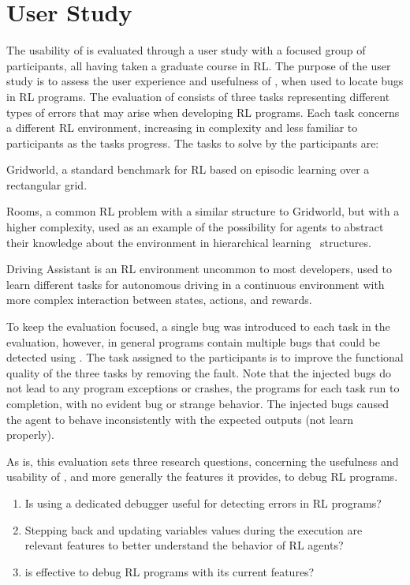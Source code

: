 
\section{User Study}
\label{sec:evaluation}

The usability of \flik is evaluated through a user study with a focused group of participants, all having 
taken a graduate course in \ac{RL}. The purpose of the user study is to assess the user experience 
and usefulness of \flik, when used to locate bugs in \ac{RL} programs. 
The evaluation of \flik consists of three tasks representing different types of errors that may arise 
when developing \ac{RL} programs. Each task concerns a different \ac{RL} environment, increasing 
in complexity and less familiar to participants as the tasks progress. The tasks to solve by the 
participants are:
\begin{enumerate*}[label=(\arabic*)]
\item Gridworld, a standard benchmark for \ac{RL} based on episodic learning over a rectangular grid.
\item Rooms, a common \ac{RL} problem with a similar structure to Gridworld, but with a higher 
complexity, used as an example of the possibility for agents to abstract their knowledge about the 
environment in hierarchical learning~\cite{pateria21} structures. 
\item Driving Assistant is an \ac{RL} environment
uncommon to most developers, used to learn different tasks for autonomous driving in a continuous 
environment with more complex interaction between states, actions, and rewards. 
\end{enumerate*}

To keep the evaluation focused, a single bug was introduced to each task in the evaluation, however, 
in general programs contain multiple bugs that could be detected using \flik. The task assigned to the 
participants is to improve the functional quality of the three tasks by removing the fault. Note that 
the injected bugs do not lead to any program exceptions or crashes, \ie the programs for each task 
run to completion, with no evident bug or strange behavior. The injected bugs caused the agent to 
behave inconsistently with the expected outputs (\eg not learn properly). 

As is, this evaluation sets three research questions, concerning the usefulness and usability of \flik, and more generally the features it provides, to debug \ac{RL} programs.
\begin{enumerate}[label=\textbf{RQ.\arabic*}]
  \item \label{enum:debugger-use} 
  Is using a dedicated debugger useful for detecting errors in \ac{RL} programs?
  \item \label{enum:features}
  Stepping back and updating variables values during the execution are relevant features to better 
  understand the behavior of \ac{RL} agents?
  \item \label{enum:usefulness}
  \flik is effective to debug \ac{RL} programs with its current features?
\end{enumerate}


